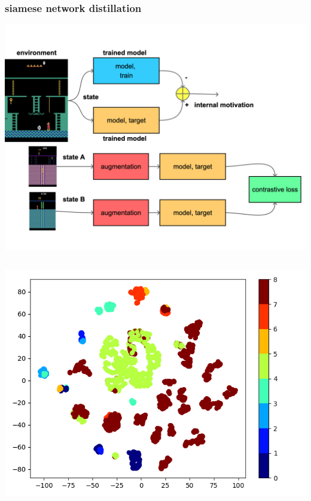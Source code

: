 \documentclass{beamer}
\begin{document}
\begin{frame}
  
  \frametitle{siamese network distillation}

  \centering
  \includegraphics[scale=0.07]{../diagrams/rnd/rndsiamdetail.png}
  \bigskip
  \begin{columns}

    \begin{column}{0.5\textwidth}
      \centering
      \includegraphics[scale=0.3]{../images/rnd_no_trained.png}
    \end{column}


\end{columns}
\end{frame}
\end{document}
